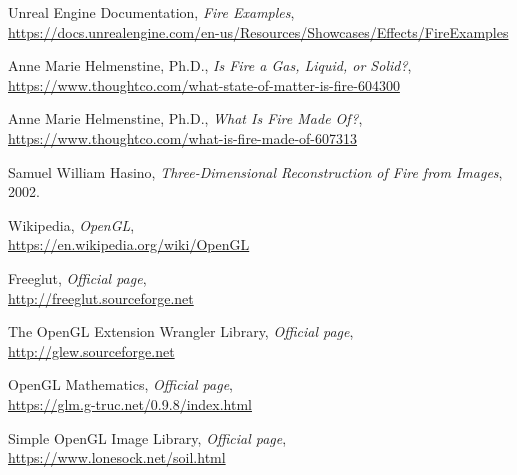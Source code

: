 \begin{thebibliography}{x}
 Unreal Engine Documentation, 
 \textit{Fire Examples},\\
 \url{https://docs.unrealengine.com/en-us/Resources/Showcases/Effects/FireExamples}

 Anne Marie Helmenstine, Ph.D., 
 \textit{Is Fire a Gas, Liquid, or Solid?},\\
 \url{https://www.thoughtco.com/what-state-of-matter-is-fire-604300}

 Anne Marie Helmenstine, Ph.D., 
 \textit{What Is Fire Made Of?},\\
 \url{https://www.thoughtco.com/what-is-fire-made-of-607313}

  Samuel William Hasino,
  \textit{Three-Dimensional Reconstruction of Fire from Images},
 2002.

 Wikipedia, 
 \textit{OpenGL},\\
 \url{https://en.wikipedia.org/wiki/OpenGL}
 
 Freeglut, 
 \textit{Official page},\\
 \url{http://freeglut.sourceforge.net}
 
 The OpenGL Extension Wrangler Library, 
 \textit{Official page},\\
 \url{http://glew.sourceforge.net}
 
 OpenGL Mathematics, 
 \textit{Official page},\\
 \url{https://glm.g-truc.net/0.9.8/index.html}

Simple OpenGL Image Library, 
 \textit{Official page},\\
 \url{https://www.lonesock.net/soil.html}

\end{thebibliography}

